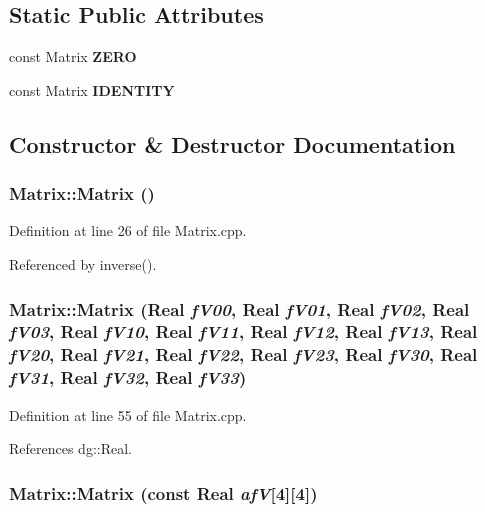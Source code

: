 \subsection*{Static Public Attributes}
\begin{CompactItemize}
\item 
const Matrix {\bf ZERO}
\item 
const Matrix {\bf IDENTITY}
\end{CompactItemize}


\subsection{Constructor \& Destructor Documentation}
\subsubsection{\setlength{\rightskip}{0pt plus 5cm}Matrix::Matrix ()}\label{classdg_1_1Matrix_a0}




Definition at line 26 of file Matrix.cpp.

Referenced by inverse().
\subsubsection{\setlength{\rightskip}{0pt plus 5cm}Matrix::Matrix ({\bf Real} {\em f\-V00}, {\bf Real} {\em f\-V01}, {\bf Real} {\em f\-V02}, {\bf Real} {\em f\-V03}, {\bf Real} {\em f\-V10}, {\bf Real} {\em f\-V11}, {\bf Real} {\em f\-V12}, {\bf Real} {\em f\-V13}, {\bf Real} {\em f\-V20}, {\bf Real} {\em f\-V21}, {\bf Real} {\em f\-V22}, {\bf Real} {\em f\-V23}, {\bf Real} {\em f\-V30}, {\bf Real} {\em f\-V31}, {\bf Real} {\em f\-V32}, {\bf Real} {\em f\-V33})}\label{classdg_1_1Matrix_a1}




Definition at line 55 of file Matrix.cpp.

References dg::Real.
\subsubsection{\setlength{\rightskip}{0pt plus 5cm}Matrix::Matrix (const {\bf Real} {\em af\-V}[4][4])}\label{classdg_1_1Matrix_a2}




